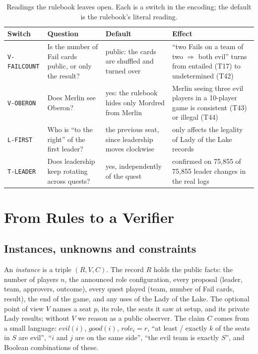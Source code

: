 \documentclass[runningheads]{llncs}
\newcommand{\cl}[1]{\texttt{#1}}
\newcommand{\evil}{\mathit{evil}}
\newcommand{\role}{\mathit{role}}
\begin{document}
\begin{table}[!htb]
\caption{Readings the rulebook leaves open. Each is a switch in the encoding; the default is the rulebook's literal
reading.}
\label{tab:variants}
\centering\scriptsize
\setlength{\tabcolsep}{3pt}\renewcommand{\arraystretch}{1.12}
\begin{tabularx}{\textwidth}{@{}l X X X@{}}
\toprule
Switch & Question & Default & Effect\\
\midrule
\cl{V-FAILCOUNT} & Is the number of Fail cards public, or only the result? & public: the cards are shuffled and turned over &
``two Fails on a team of two $\Rightarrow$ both evil'' turns from entailed (T17) to undetermined (T42)\\
\cl{V-OBERON} & Does Merlin see Oberon? & yes: the rulebook hides only Mordred from Merlin &
Merlin seeing three evil players in a 10-player game is consistent (T43) or illegal (T44)\\
\cl{L-FIRST} & Who is ``to the right'' of the first leader? & the previous seat, since leadership moves clockwise &
only affects the legality of Lady of the Lake records\\
\cl{T-LEADER} & Does leadership keep rotating across quests? & yes, independently of the quest &
confirmed on 75,855 of 75,855 leader changes in the real logs\\
\bottomrule
\end{tabularx}
\end{table}

\section{From Rules to a Verifier}\label{sec:verifier}
\subsection{Instances, unknowns and constraints}
An \emph{instance} is a triple $(R,V,C)$. The record $R$ holds the public facts: the number of players $n$, the
announced role configuration, every proposal (leader, team, approvers, outcome), every quest played (team, number of
Fail cards, result), the end of the game, and any uses of the Lady of the Lake. The optional point of view $V$ names
a seat $p$, its role, the seats it saw at setup, and its private Lady results; without $V$ we reason as a public
observer. The claim $C$ comes from a small language: $\evil(i)$, $\mathit{good}(i)$, $\role_i=r$, ``at least / exactly
$k$ of the seats in $S$ are evil'', ``$i$ and $j$ are on the same side'', ``the evil team is exactly $S$'', and Boolean
combinations of these.
\end{document}
